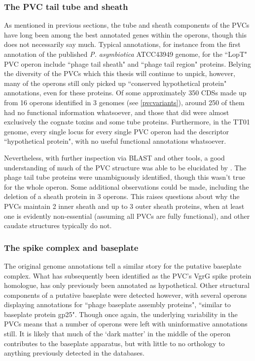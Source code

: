 \subsubsection{The PVC tail tube and sheath}
As mentioned in previous sections, the tube and sheath components of the PVCs have long been among the best annotated genes within the operons, though this does not necessarily say much. Typical annotations, for instance from the first annotation of the published \emph{P. asymbiotica} ATCC43949 genome, for the ``LopT" PVC operon include ``phage tail sheath" and ``phage tail region" proteins. Belying the diversity of the PVCs which this thesis will continue to unpick, however, many of the operons still only picked up ``conserved hypothetical protein" annotations, even for these proteins. Of some approximately 350 CDSs made up from 16 operons identified in 3 genomes (see \vref{pvcvariants}), around 250 of them had no functional information whatsoever, and those that did were almost exclusively the cognate toxins and some tube proteins. Furthermore, in the TT01 genome, every single locus for every single PVC operon had the descriptor ``hypothetical protein", with no useful functional annotations whatsoever.

Nevertheless, with further inspection via BLAST and other tools, a good understanding of much of the PVC structure was able to be elucidated by \cite{Yang2006}. The phage tail tube proteins were unambiguously identified, though this wasn't true for the whole operon. Some additional observations could be made, including the deletion of a sheath protein in 3 operons. This raises questions about why the PVCs maintain 2 inner sheath and up to 3 outer sheath proteins, when at least one is evidently non-essential (assuming all PVCs are fully functional), and other caudate structures typically do not.

\subsubsection{The spike complex and baseplate}
The original genome annotations tell a similar story for the putative baseplate complex. What has subsequently been identified as the PVC's VgrG spike protein homologue, has only previously been annotated as hypothetical. Other structural components of a putative baseplate were detected however, with several operons displaying annotations for ``phage baseplate assembly proteins", ``similar to baseplate protein gp25". Though once again, the underlying variability in the PVCs means that a number of operons were left with uninformative annotations still. It is likely that much of the `dark matter' in the middle of the operon contributes to the baseplate apparatus, but with little to no orthology to anything previously detected in the databases.

